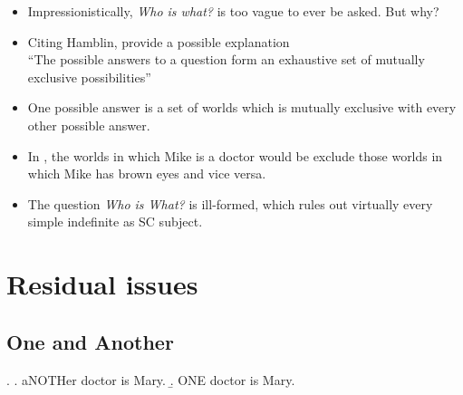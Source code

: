 \documentclass[letterpaper]{article}
\begin{document}
\begin{itemize}
  \item Impressionistically, \textit{Who is what?} is too vague to ever be asked. But why?
  \item  Citing Hamblin, \textcite{groenendijkstokhof1996questions} provide a possible explanation\\
    ``The possible answers to a question form an exhaustive set of mutually exclusive possibilities''
  \item One possible answer is a set of worlds which is mutually exclusive with every other possible answer.
  \item In \Last, the worlds in which Mike is a doctor would be exclude those worlds in which Mike has brown eyes and vice versa.
  \item The question \textit{Who is What?} is ill-formed, which rules out virtually every simple indefinite as SC subject.
\end{itemize}
%
\section{Residual issues}
\subsection{One and Another}
\ex.
\a.\label{ex:AnotherSC} aNOTHer doctor is Mary.
\b.\label{ex:OneSC} ONE doctor is Mary.
\end{document}
